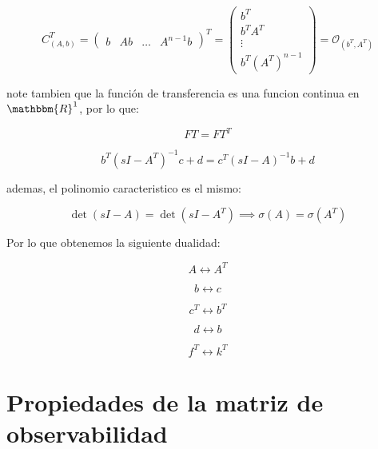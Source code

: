 		\begin{equation}
			C^T_{(A, b)} =
			\begin{pmatrix}
				b & A b & \dots & A^{n-1} b
			\end{pmatrix}^T =
			\begin{pmatrix}
				b^T \\
				b^T A^T \\
				\vdots \\
				b^T (A^T)^{n-1}
			\end{pmatrix} = \mathcal{O}_{(b^T, A^T)}
		\end{equation}

		note tambien que la función de transferencia es una funcion continua en $\mathbbm{R}^1$, por lo que:

		\begin{equation*}
			FT = FT^T
		\end{equation*}

		\begin{equation}
			b^T \left( sI - A^T \right)^{-1} c + d = c^T \left( sI - A \right)^{-1} b + d
		\end{equation}

		ademas, el polinomio caracteristico es el mismo:

		\begin{equation}
			\det{(sI - A)} = \det{(sI - A^T)} \implies \sigma(A) = \sigma (A^T)
		\end{equation}

		Por lo que obtenemos la siguiente dualidad:

		\begin{equation*}
			A \leftrightarrow A^T
		\end{equation*}

		\begin{equation*}
			b \leftrightarrow c
		\end{equation*}

		\begin{equation*}
			c^T \leftrightarrow b^T
		\end{equation*}

		\begin{equation*}
			d \leftrightarrow b
		\end{equation*}

		\begin{equation*}
			f^T \leftrightarrow k^T
		\end{equation*}

    \newpage
    \section{Propiedades de la matriz de observabilidad}

